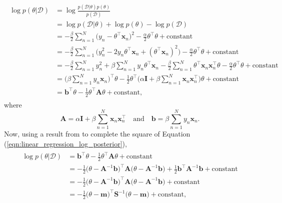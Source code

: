 \documentclass[msc,deptreport.inf]{infthesis} %
\newcommand{\matr}[1]{\mathbf{#1}}
\begin{document}
\begin{align}\label{eqn:linear_regression_log_posterior}
\begin{split}
	\log p(\theta | \mathcal{D}) 
	& = \log \frac{p(\mathcal{D} | \theta) p(\theta)}{p(\mathcal{D})} \\
	& = \log p(\mathcal{D} | \theta) + \log p(\theta) - \log p(\mathcal{D}) \\
	& = -\frac{\beta}{2} \sum_{n=1}^N \big(y_n - \theta^\intercal \matr{x}_n \big)^2 
	-\frac{\alpha}{2} \theta^\intercal \theta 
	+ \text{constant} \\
	& = -\frac{\beta}{2} \sum_{n=1}^N\big( y_n^2 - 2 y_n \theta^\intercal \matr{x}_n + (\theta^\intercal \matr{x}_n)^2 \big)
	-\frac{\alpha}{2} \theta^\intercal \theta
	+ \text{constant} \\
	& = -\frac{\beta}{2} \sum_{n=1}^N y_n^2
	+ \beta \sum_{n=1}^N y_n \theta^\intercal \matr{x}_n
	-\frac{\beta}{2} \sum_{n=1}^N \theta^\intercal \matr{x}_n \matr{x}_n^\intercal \theta
	-\frac{\alpha}{2} \theta^\intercal \theta
	+ \text{constant} \\
	& = \Big(\beta \sum_{n=1}^N y_n \matr{x}_n \Big)^\intercal \theta 
	-\frac{1}{2} \theta^\intercal \Big( \alpha \matr{I} + \beta \sum_{n=1}^N \matr{x}_n \matr{x}_n^\intercal \Big) \theta 
	+ \text{constant} \\
	& = \matr{b}^\intercal \theta 
	- \frac{1}{2} \theta^\intercal \matr{A} \theta 
	+ \text{constant},
\end{split}
\end{align}
where 
\begin{equation}
	\matr{A} = \alpha \matr{I} + \beta \sum_{n=1}^N \matr{x}_n \matr{x}_n^\intercal
	\quad \text{and} \quad 
	\matr{b} = \beta \sum_{n=1}^N y_n \matr{x}_n.
\end{equation}
Now, using a result from \cite{barber2007} to complete the square of Equation (\ref{eqn:linear_regression_log_posterior}),
\begin{align}
\begin{split}
	\log p(\theta | \mathcal{D}) 
	& = \matr{b}^\intercal \theta 
	- \frac{1}{2} \theta^\intercal \matr{A} \theta 
	+ \text{constant} \\
	& = -\frac{1}{2} \big(\theta - \matr{A}^{-1} \matr{b} \big)^\intercal \matr{A} \big(\theta - \matr{A}^{-1} \matr{b} \big)
	+ \frac{1}{2} \matr{b}^\intercal \matr{A}^{-1} \matr{b}
	+ \text{constant} \\
	& = -\frac{1}{2} \big(\theta - \matr{A}^{-1} \matr{b} \big)^\intercal \matr{A} \big(\theta - \matr{A}^{-1} \matr{b} \big)
	+ \text{constant} \\
	& = -\frac{1}{2} \big(\theta - \matr{m} \big)^\intercal \matr{S}^{-1} \big(\theta - \matr{m} \big)
	+ \text{constant},
\end{split}
\end{align}
\end{document}
